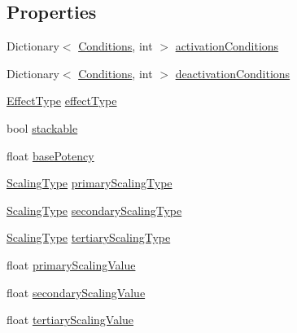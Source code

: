 \subsection*{Properties}
\begin{DoxyCompactItemize}
\item 
Dictionary$<$ \mbox{\hyperlink{class_effect_ab13a718053e330a11f9f66a9b16f4686}{Conditions}}, int $>$ \mbox{\hyperlink{class_effect_abee804d3dd2ba5e3074d9fde9beedf07}{activation\+Conditions}}
\item 
Dictionary$<$ \mbox{\hyperlink{class_effect_ab13a718053e330a11f9f66a9b16f4686}{Conditions}}, int $>$ \mbox{\hyperlink{class_effect_a364788c565859970111c834c3da7f15d}{deactivation\+Conditions}}
\item 
\mbox{\hyperlink{class_effect_a28d85888db94ec53ee9cb75e9706f6e4}{Effect\+Type}} \mbox{\hyperlink{class_effect_a5cf8eca9899b1ce70a9cdad8ab6f5f1e}{effect\+Type}}
\item 
bool \mbox{\hyperlink{class_effect_a38b8b477fdedcf31c0aea3ecdc64c0c9}{stackable}}
\item 
float \mbox{\hyperlink{class_effect_a8a406c60ab681a1b0a68365042b32a44}{base\+Potency}}
\item 
\mbox{\hyperlink{class_effect_af0ada789de40f58c24c46bf8ed2f300c}{Scaling\+Type}} \mbox{\hyperlink{class_effect_a008086eef4214cbf113387f8ac5ed1cc}{primary\+Scaling\+Type}}
\item 
\mbox{\hyperlink{class_effect_af0ada789de40f58c24c46bf8ed2f300c}{Scaling\+Type}} \mbox{\hyperlink{class_effect_a790aa2e053b911e609f7655f4d39707c}{secondary\+Scaling\+Type}}
\item 
\mbox{\hyperlink{class_effect_af0ada789de40f58c24c46bf8ed2f300c}{Scaling\+Type}} \mbox{\hyperlink{class_effect_af01f4eaea6040a558e1f3369e28f6bb2}{tertiary\+Scaling\+Type}}
\item 
float \mbox{\hyperlink{class_effect_ae5beb1965b997d1521bc8a268e963883}{primary\+Scaling\+Value}}
\item 
float \mbox{\hyperlink{class_effect_ae89279b1f9cc23e174f15756093c898a}{secondary\+Scaling\+Value}}
\item 
float \mbox{\hyperlink{class_effect_a92631b7dfe2c5d0bfba281cc8f113159}{tertiary\+Scaling\+Value}}
\end{DoxyCompactItemize}


